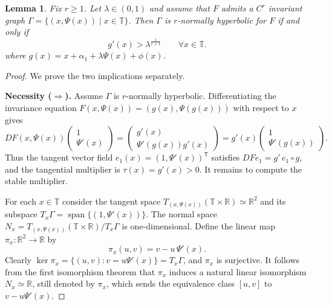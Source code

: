 \documentclass{amsart}
\newtheorem{Lemma}[Definition]{Lemma}
\begin{document}
	\begin{Lemma}\label{lem:nh-iff}Fix $r\geq 1$.
		Let $\lambda\in(0,1)$ and assume that
		$F$
		admits a $C^r$ invariant graph $\Gamma=\{(x,\Psi(x))\mid x\in\mathbb{T}\}$.
		Then $\Gamma$ is $r$-normally hyperbolic for $F$ if and only if
		\[
		g'(x)>\lambda^{\frac{1}{r+1}}\qquad\forall x\in\mathbb{T}.
		\]
		where $g(x)=x+\alpha_1+\lambda\Psi(x)+\phi(x)$.
	\end{Lemma}
	
	\begin{proof}
		We prove the two implications separately.
		
		\noindent\textbf{Necessity ($\Rightarrow$).}
		Assume $\Gamma$ is $r$-normally hyperbolic. Differentiating the invariance equation $F(x,\Psi(x))=(g(x),\Psi(g(x)))$ with respect to $x$ gives
\[
DF(x,\Psi(x))\begin{pmatrix} 1 \\ \Psi'(x) \end{pmatrix}
= \begin{pmatrix} g'(x) \\ \Psi'(g(x))g'(x) \end{pmatrix}
= g'(x)\begin{pmatrix} 1 \\ \Psi'(g(x)) \end{pmatrix}.
\]
Thus the tangent vector field $e_1(x)=(1,\Psi'(x))^{\mathsf{T}}$ satisfies
$DF e_1 = g'\, e_1\circ g$, and the tangential multiplier is $\tau(x)=g'(x)>0$. It remains to compute the stable multiplier.

\medskip

For each $x\in\mathbb{T}$ consider the tangent space $T_{(x,\Psi(x))}(\mathbb{T}\times\mathbb{R}) \simeq \mathbb{R}^2$
and its subspace $T_x\Gamma = \operatorname{span}\{(1,\Psi'(x))\}$.  The normal space
$N_x = T_{(x,\Psi(x))}(\mathbb{T}\times\mathbb{R}) / T_x\Gamma$ is one-dimensional.
Define the linear map $\pi_x: \mathbb{R}^2 \to \mathbb{R}$ by
\[
\pi_x(u,v) = v - u\,\Psi'(x).
\]
Clearly $\ker\pi_x = \{(u,v): v=u\Psi'(x)\} = T_x\Gamma$, and $\pi_x$ is surjective.  It follows from the first isomorphism theorem  that $\pi_x$ induces a natural
linear isomorphism $N_x\simeq\mathbb{R}$, still denoted by $\pi_x$,
which sends the equivalence class $[u,v]$ to $v-u\Psi'(x)$.


\end{proof}
\end{document}
